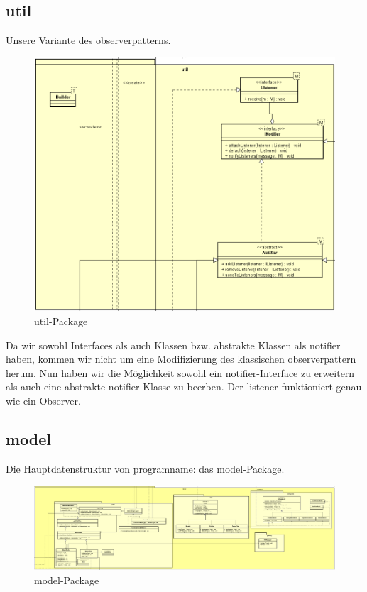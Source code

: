\subsection{util}
\label{subsec:util}

Unsere Variante des \gls{observerpattern}s.

\begin{figure}[H]
  \centering
  \includegraphics[width=\textwidth]{../diagramimages/util.png}
  \caption{util-Package}
\end{figure}

Da wir sowohl Interfaces als auch Klassen bzw. abstrakte Klassen als
\gls{notifier} haben, kommen wir nicht um eine Modifizierung des klassischen
\gls{observerpattern} herum. Nun haben wir die Möglichkeit sowohl ein
\gls{notifier}-Interface zu erweitern als auch eine abstrakte
\gls{notifier}-Klasse zu beerben. Der \gls{listener} funktioniert genau wie ein
Observer.


\subsection{model}
\label{subsec:model}

Die Hauptdatenstruktur von \gls{programname}: das model-Package.

\begin{figure}[H]
  \centering
  \includegraphics[width=\textwidth]{../diagramimages/model.png}
  \caption{model-Package}
\end{figure}

